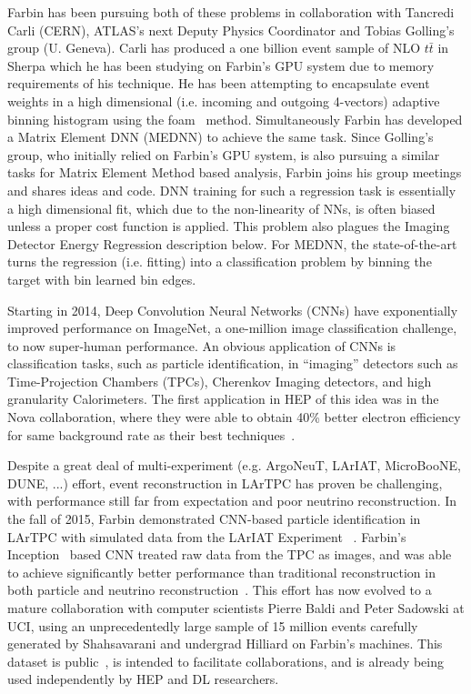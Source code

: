 Farbin has been pursuing both of these problems in collaboration with
Tancredi Carli (CERN), ATLAS's next Deputy Physics Coordinator and
Tobias Golling's group (U. Geneva). Carli has produced a one billion
event sample of NLO $t\bar{t}$ in Sherpa which he has been studying on
Farbin's GPU system due to memory requirements of his technique. He
has been attempting to encapsulate event weights in a high dimensional
(i.e. incoming and outgoing 4-vectors) adaptive binning histogram
using the foam~\cite{} method. Simultaneously Farbin has developed a
Matrix Element DNN (MEDNN) to achieve the same task. Since Golling's
group, who initially relied on Farbin's GPU system, is also pursuing a
similar tasks for Matrix Element Method based analysis, Farbin joins
his group meetings and shares ideas and code. DNN training for such a
regression task is essentially a high dimensional fit, which due to
the non-linearity of NNs, is often biased unless a proper cost
function is applied. This problem also plagues the Imaging Detector
Energy Regression description below. For MEDNN, the state-of-the-art
turns the regression (i.e. fitting) into a classification problem by
binning the target with bin learned bin edges.


Starting in 2014, Deep Convolution Neural Networks (CNNs) have
exponentially improved performance on ImageNet, a one-million image
classification challenge\cite{}, to now super-human
performance\cite{}.  An obvious application of CNNs is classification
tasks, such as particle identification, in ``imaging'' detectors such
as Time-Projection Chambers (TPCs), Cherenkov Imaging detectors, and
high granularity Calorimeters. The first application in HEP of this
idea was in the Nova collaboration, where they were able to obtain
40\% better electron efficiency for same background rate as their best
techniques~\cite{}.


Despite a great deal of multi-experiment (e.g. ArgoNeuT, LArIAT,
MicroBooNE, DUNE, ...) effort, event reconstruction in LArTPC has
proven be challenging, with performance still far from expectation and
poor neutrino reconstruction.  In the fall of 2015, Farbin
demonstrated CNN-based particle identification in LArTPC with
simulated data from the LArIAT Experiment ~\cite{}.  Farbin's
Inception~\cite{} based CNN treated raw data from the TPC as images,
and was able to achieve significantly better performance than
traditional reconstruction in both particle and neutrino
reconstruction~\cite{}. This effort has now evolved to a mature
collaboration with computer scientists Pierre Baldi and Peter Sadowski
at UCI, using an unprecedentedly large sample of 15 million events
carefully generated by Shahsavarani and undergrad Hilliard on Farbin's
machines. This dataset is public~\cite{}, is intended to facilitate
collaborations, and is already being used independently by HEP and DL
researchers. 

